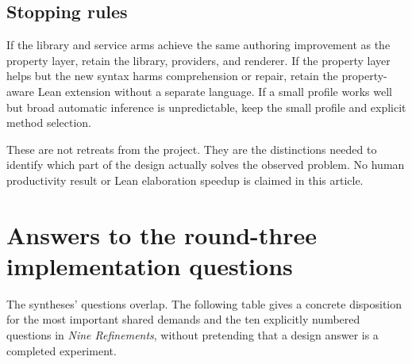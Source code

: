 \documentclass[11pt,a4paper]{article}
\theoremstyle{definition}
\theoremstyle{remark}
\begin{document}
\subsection{Stopping rules}

If the library and service arms achieve the same authoring improvement as the
property layer, retain the library, providers, and renderer. If the property
layer helps but the new syntax harms comprehension or repair, retain the
property-aware Lean extension without a separate language. If a small profile
works well but broad automatic inference is unpredictable, keep the small
profile and explicit method selection.

These are not retreats from the project. They are the distinctions needed to
identify which part of the design actually solves the observed problem.
No human productivity result or Lean elaboration speedup is claimed in this
article.

\section{Answers to the round-three implementation questions}\label{sec:answers}

The syntheses' questions overlap. The following table gives a concrete disposition
for the most important shared demands and the ten explicitly numbered questions
in \emph{Nine Refinements}, without pretending that a design answer is a
completed experiment.
\end{document}
